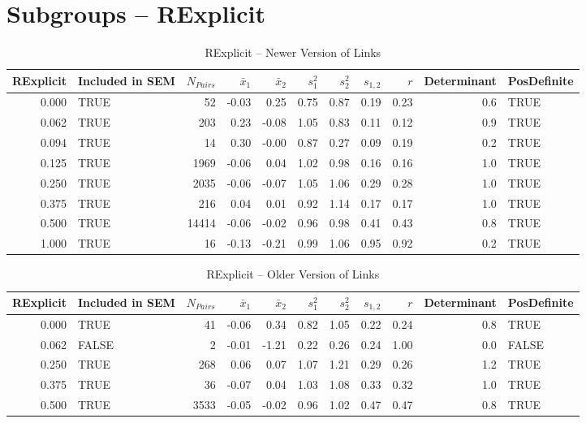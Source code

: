 \documentclass{article}\usepackage[]{graphicx}\usepackage[]{color}
\begin{document}
\section{Subgroups --  RExplicit }%
\begin{table}[ht]
\centering
\begin{tabular}{rlrrrrrrrrl}
  \hline
RExplicit & Included in SEM & $N_{Pairs}$ & $\bar{x}_1$ & $\bar{x}_2$ & $s_1^2$ & $s_2^2$ & $s_{1,2}$ & $r$ & Determinant & PosDefinite \\ 
  \hline
0.000 & TRUE & 52 & -0.03 & 0.25 & 0.75 & 0.87 & 0.19 & 0.23 & 0.6 & TRUE \\ 
  0.062 & TRUE & 203 & 0.23 & -0.08 & 1.05 & 0.83 & 0.11 & 0.12 & 0.9 & TRUE \\ 
  0.094 & TRUE & 14 & 0.30 & -0.00 & 0.87 & 0.27 & 0.09 & 0.19 & 0.2 & TRUE \\ 
  0.125 & TRUE & 1969 & -0.06 & 0.04 & 1.02 & 0.98 & 0.16 & 0.16 & 1.0 & TRUE \\ 
  0.250 & TRUE & 2035 & -0.06 & -0.07 & 1.05 & 1.06 & 0.29 & 0.28 & 1.0 & TRUE \\ 
  0.375 & TRUE & 216 & 0.04 & 0.01 & 0.92 & 1.14 & 0.17 & 0.17 & 1.0 & TRUE \\ 
  0.500 & TRUE & 14414 & -0.06 & -0.02 & 0.96 & 0.98 & 0.41 & 0.43 & 0.8 & TRUE \\ 
  1.000 & TRUE & 16 & -0.13 & -0.21 & 0.99 & 1.06 & 0.95 & 0.92 & 0.2 & TRUE \\ 
   \hline
\end{tabular}
\caption{RExplicit -- Newer Version of Links} 
\end{table}
\begin{table}[ht]
\centering
\begin{tabular}{rlrrrrrrrrl}
  \hline
RExplicit & Included in SEM & $N_{Pairs}$ & $\bar{x}_1$ & $\bar{x}_2$ & $s_1^2$ & $s_2^2$ & $s_{1,2}$ & $r$ & Determinant & PosDefinite \\ 
  \hline
0.000 & TRUE & 41 & -0.06 & 0.34 & 0.82 & 1.05 & 0.22 & 0.24 & 0.8 & TRUE \\ 
  0.062 & FALSE & 2 & -0.01 & -1.21 & 0.22 & 0.26 & 0.24 & 1.00 & 0.0 & FALSE \\ 
  0.250 & TRUE & 268 & 0.06 & 0.07 & 1.07 & 1.21 & 0.29 & 0.26 & 1.2 & TRUE \\ 
  0.375 & TRUE & 36 & -0.07 & 0.04 & 1.03 & 1.08 & 0.33 & 0.32 & 1.0 & TRUE \\ 
  0.500 & TRUE & 3533 & -0.05 & -0.02 & 0.96 & 1.02 & 0.47 & 0.47 & 0.8 & TRUE \\ 
   \hline
\end{tabular}
\caption{RExplicit -- Older Version of Links} 
\end{table}
\newpage 
\end{document}
